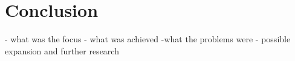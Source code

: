 \chapter*{Conclusion}\label{chap:concl}


- what was the focus
- what was achieved
-what the problems were
- possible expansion and further research
